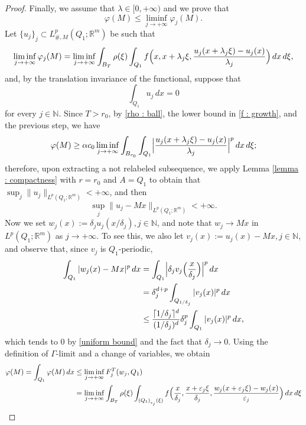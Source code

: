\documentclass{article}
\theoremstyle{definition}
\newcommand{\f}{\varphi}
\newcommand{\ej}{\varepsilon_j}
\newcommand{\dej}{\delta_j}
\newcommand{\N}{\mathbb{N}}
\newcommand{\R}{\mathbb{R}}
\begin{document}
\begin{proof}
\smallskip

Finally, we assume that  $\lambda\in[0,+\infty)$ and  we prove that
\begin{equation}\label{cell lemma bis}
      \f(M) \leq \liminf_{j\to+\infty} \f_j(M).
\end{equation}
Let $\{u_j\}_j\subset L^p_{\#,M}(Q_1;\R^m)$ be such that 
\begin{equation*}
    \liminf_{j\to+\infty} \f_j(M) = \liminf_{j\to+\infty} \int_{B_T} \rho(\xi)\int_{Q_1} f\Bigl(x,x+\lambda_j\xi,\frac{u_j(x+\lambda_j\xi)-u_j(x)}{\lambda_j}\Bigr)\, dx\,d\xi, 
\end{equation*}
and, by the translation invariance of the functional, suppose that
\begin{equation*}
    \int_{Q_1}u_j\,dx=0
\end{equation*}
for every $j\in\N$. Since $T>r_0$, by \eqref{rho : ball}, the lower bound in \eqref{f : growth}, and the previous step, we have 
\begin{equation*}
\f(M)\geq \alpha c_0\liminf_{j\to+\infty} \int_{B_{r_0}} \int_{Q_1}\Bigl|\frac{u_j(x+\lambda_j\xi)-u_j(x)}{\lambda_j}\Bigr|^p \, dx\,d\xi;
\end{equation*}
therefore, upon extracting a not relabeled subsequence,  we apply Lemma \ref{lemma : compactness} with $r=r_0$ and $A=Q_1$ to obtain that $\sup_{j} \|u_j\|_{L^p(Q_1;\R^m)}<+\infty$, and then
\begin{equation}\label{uniform bound}
 \sup_{j} \|u_j-Mx\|_{L^p(Q_1;\R^m)}<+\infty.
\end{equation}
Now we set $w_j(x):=\dej u_j(x/\dej), j\in \N$, and note that $w_j\to Mx$ in $L^p(Q_1;\R^m)$ as $j\to+\infty$. To see this, we also let $v_j(x):=u_j(x)-Mx, j\in\N$, and observe that, since $v_j$ is $Q_1$-periodic, \begin{align*}
    \int_{Q_1}|w_j(x)-Mx|^p\,dx & = \int_{Q_1}\Bigl|\dej v_j\Bigl(\frac{x}{\dej}\Bigr)\Bigr|^p\,dx \\
    & = \dej^{d+p}\int_{Q_{1/\dej}} |v_j(x)|^p\, dx \\
    & \leq \frac{\lceil1/\dej\rceil^d} {(1/\dej)^d}\dej^p\int_{Q_1}|v_j(x)|^p\,dx,
\end{align*}
which tends to $0$ by \eqref{uniform bound} and the fact that $\dej\to0$. Using the definition of $\Gamma$-limit and a change of variables, we obtain
\begin{align*}
  \f(M) = \int_{Q_1} \f(M)\, dx & \leq \liminf_{j\to+\infty} F^T_j(w_j, Q_1) \\
    & = \liminf_{j\to+\infty} \int_{B_T} \rho(\xi)\int_{{(Q_1)}_{\ej}(\xi)} f\Bigl(\frac{x}{\dej},\frac{x+\ej\xi}{\dej},\frac{w_j(x+\ej\xi)-w_j(x)}{\ej}\Bigr)\, dx\,d\xi \\

\end{align*}
\end{proof}
\end{document}
